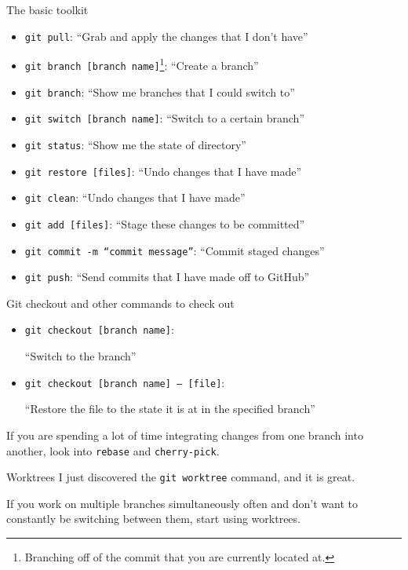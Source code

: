 \begin{frame}{The basic toolkit}
    \stretchon
    \begin{itemize}
        \item[]\texttt{git pull}: ``Grab and apply the changes that I don't have''
        \item[]\texttt{git branch [branch name]}\footnote{
                \scriptsize Branching off of the commit that you are currently located at.
            }: ``Create a branch''
        \item[]\texttt{git branch}: ``Show me branches that I could switch to''
        \item[]\texttt{git switch [branch name]}: ``Switch to a certain branch''
        \item[]\texttt{git status}: ``Show me the state of directory''
        \item[]\texttt{git restore [files]}: ``Undo changes that I have made''
        \item[]\texttt{git clean}: ``Undo changes that I have made''
        \item[]\texttt{git add [files]}: ``Stage these changes to be committed''
        \item[]\texttt{git commit -m ``commit message''}: ``Commit staged changes''
        \item[]\texttt{git push}: ``Send commits that I have made off to GitHub''
    \end{itemize}
\end{frame}

\begin{frame}{Git checkout and other commands to check out}
    \stretchon
    \begin{itemize}
    \item[]\texttt{git checkout [branch name]}:

        ``Switch to the branch''
    \item[]\texttt{git checkout [branch name] -- [file]}:

        ``Restore the file to the state it
    is at in the specified branch''
    \end{itemize}

    If you are spending a lot of time integrating changes from one branch into
    another, look into \texttt{rebase} and \texttt{cherry-pick}.
\end{frame}

\begin{frame}{Worktrees}
    \stretchon
    I just discovered the \texttt{git worktree} command,
    and it is great.

    If you work on multiple branches simultaneously often and don't want to constantly
    be switching between them, start using worktrees.
\end{frame}

